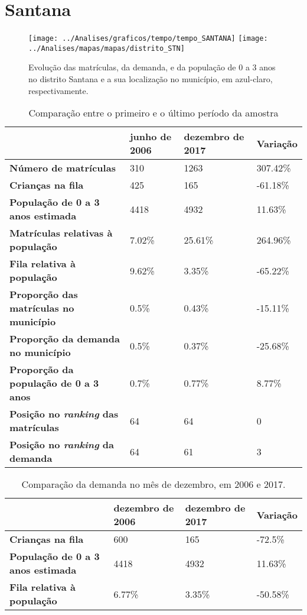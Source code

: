 \section{Santana}
\begin{figure}[H]
\centering
\texttt{[image: ../Analises/graficos/tempo/tempo\_SANTANA]}
\texttt{[image: ../Analises/mapas/mapas/distrito\_STN]}
\caption{Evolução das matrículas, da demanda, e da população de 0 a 3 anos no distrito Santana e a sua localização no município, em azul-claro, respectivamente.}
\end{figure}
\begin{table}[H]
\begin{tabular}{l|l|l|l}
\textbf{}                                      & \textbf{junho de 2006}       & \textbf{dezembro de 2017}    & \textbf{Variação} \\ \hline
\textbf{Número de matrículas}                  & 310 & 1263 & 307.42\% \\ \hline
\textbf{Crianças na fila}                      & 425 & 165 & -61.18\% \\ \hline
\textbf{População de 0 a 3 anos estimada}      & 4418 & 4932 & 11.63\% \\ \hline
\textbf{Matrículas relativas à população}      & 7.02\% & 25.61\% & 264.96\% \\ \hline
\textbf{Fila relativa à população}             & 9.62\% & 3.35\% & -65.22\% \\ \hline
\textbf{Proporção das matrículas no município} & 0.5\% & 0.43\% & -15.11\% \\ \hline
\textbf{Proporção da demanda no município}     & 0.5\% & 0.37\% & -25.68\% \\ \hline
\textbf{Proporção da população de 0 a 3 anos}  & 0.7\% & 0.77\% & 8.77\% \\ \hline
\textbf{Posição no \textit{ranking} das matrículas}     & 64 & 64 & 0 \\ \hline
\textbf{Posição no \textit{ranking} da demanda}         & 64 & 61 & 3 \\ 
\end{tabular}
\caption{Comparação entre o primeiro e o último período da amostra}
\end{table}
\begin{table}[H]
\begin{tabular}{l|l|l|l}
\textbf{}                                 & \textbf{dezembro de 2006} & \textbf{dezembro de 2017} & \textbf{Variação} \\ \hline
\textbf{Crianças na fila}                      & 600 & 165 & -72.5\% \\ \hline
\textbf{População de 0 a 3 anos estimada}      & 4418 & 4932 & 11.63\% \\ \hline
\textbf{Fila relativa à população}             & 6.77\% & 3.35\% & -50.58\% \\
\end{tabular}
\caption{Comparação da demanda no mês de dezembro, em 2006 e 2017.}
\end{table}
